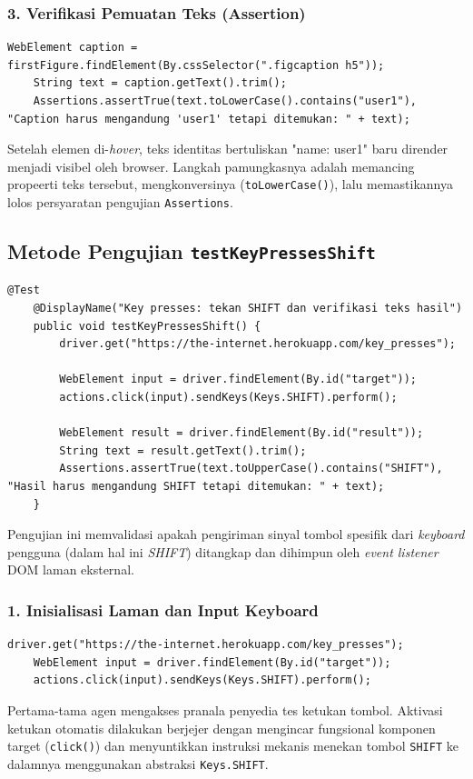 \documentclass[a4paper,oneside,12pt]{report}
\begin{document}
\subsubsection*{3. Verifikasi Pemuatan Teks (Assertion)}
\begin{lstlisting}[style=javastyle]
    WebElement caption = firstFigure.findElement(By.cssSelector(".figcaption h5"));
    String text = caption.getText().trim();
    Assertions.assertTrue(text.toLowerCase().contains("user1"), "Caption harus mengandung 'user1' tetapi ditemukan: " + text);
\end{lstlisting}
Setelah elemen di-\textit{hover}, teks identitas bertuliskan "name: user1" baru dirender menjadi visibel oleh browser. Langkah pamungkasnya adalah memancing propeerti teks tersebut, mengkonversinya (\texttt{toLowerCase()}), lalu memastikannya lolos persyaratan pengujian \texttt{Assertions}.

\subsection{Metode Pengujian \texttt{testKeyPressesShift}}
\begin{lstlisting}[style=javastyle, caption=Metode Utuh \texttt{testKeyPressesShift}]
    @Test
    @DisplayName("Key presses: tekan SHIFT dan verifikasi teks hasil")
    public void testKeyPressesShift() {
        driver.get("https://the-internet.herokuapp.com/key_presses");

        WebElement input = driver.findElement(By.id("target"));
        actions.click(input).sendKeys(Keys.SHIFT).perform();

        WebElement result = driver.findElement(By.id("result"));
        String text = result.getText().trim();
        Assertions.assertTrue(text.toUpperCase().contains("SHIFT"), "Hasil harus mengandung SHIFT tetapi ditemukan: " + text);
    }
\end{lstlisting}
Pengujian ini memvalidasi apakah pengiriman sinyal tombol spesifik dari \textit{keyboard} pengguna (dalam hal ini \textit{SHIFT}) ditangkap dan dihimpun oleh \textit{event listener} DOM laman eksternal.

\subsubsection*{1. Inisialisasi Laman dan Input Keyboard}
\begin{lstlisting}[style=javastyle]
    driver.get("https://the-internet.herokuapp.com/key_presses");
    WebElement input = driver.findElement(By.id("target"));
    actions.click(input).sendKeys(Keys.SHIFT).perform();
\end{lstlisting}
Pertama-tama agen mengakses pranala penyedia tes ketukan tombol. Aktivasi ketukan otomatis dilakukan berjejer dengan mengincar fungsional komponen target (\texttt{click()}) dan menyuntikkan instruksi mekanis menekan tombol \texttt{SHIFT} ke dalamnya menggunakan abstraksi \texttt{Keys.SHIFT}.
\end{document}
